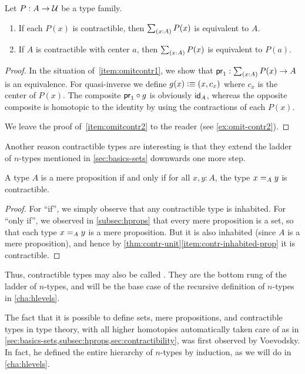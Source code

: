 \begin{lem}\label{thm:omit-contr}
  Let $P:A\to\type$ be a type family.
  \begin{enumerate}
  \item If each $P(x)$ is contractible, then $\sm{x:A} P(x)$ is equivalent to $A$.\label{item:omitcontr1}
  \item If $A$ is contractible with center $a$, then $\sm{x:A} P(x)$ is equivalent to $P(a)$.\label{item:omitcontr2}
  \end{enumerate}
\end{lem}
\begin{proof}
  In the situation of~\ref{item:omitcontr1}, we show that $\proj1:\sm{x:A} P(x) \to A$ is an equivalence.
  For quasi-inverse we define $g(x)\defeq (x,c_x)$ where $c_x$ is the center of $P(x)$.
  The composite $\proj1 \circ g$ is obviously $\idfunc[A]$, whereas the opposite composite is homotopic to the identity by using the contractions of each $P(x)$.

  We leave the proof of~\ref{item:omitcontr2} to the reader (see \autoref{ex:omit-contr2}).
\end{proof}

Another reason contractible types are interesting is that they extend the ladder of $n$-types mentioned in \autoref{sec:basics-sets} downwards one more step.

\begin{lem}\label{thm:prop-minusonetype}
  A type $A$ is a mere proposition if and only if for all $x,y:A$, the type $\id[A]xy$ is contractible.
\end{lem}
\begin{proof}
  For ``if'', we simply observe that any contractible type is inhabited.
  For ``only if'', we observed in \autoref{subsec:hprops} that every mere proposition is a set, so that each type $\id[A]xy$ is a mere proposition.
  But it is also inhabited (since $A$ is a mere proposition), and hence by \autoref{thm:contr-unit}\ref{item:contr-inhabited-prop} it is contractible.
\end{proof}

Thus, contractible types may also be called .
They are the bottom rung of the ladder of $n$-types, and will be the base case of the recursive definition of $n$-types in \autoref{cha:hlevels}.

\sectionNotes

The fact that it is possible to define sets, mere propositions, and contractible types in type theory, with all higher homotopies automatically taken care of as in \autoref{sec:basics-sets,subsec:hprops,sec:contractibility}, was first observed by Voevodsky.
In fact, he defined the entire hierarchy of $n$-types by induction, as we will do in \autoref{cha:hlevels}.


